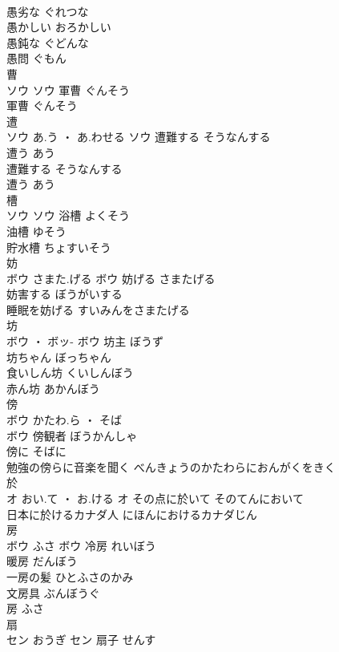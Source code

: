 \documentclass[8pt]{extreport}
\begin{document}
\begin{CJK}{UTF8}{min}
\\	愚劣な	ぐれつな	
\\	愚かしい	おろかしい	
\\	愚鈍な	ぐどんな	
\\	愚問	ぐもん	
\\	曹	
\\	ソウ		ソウ	軍曹	ぐんそう	
\\	軍曹	ぐんそう	
\\	遭	
\\	ソウ	あ.う ・ あ.わせる	ソウ	遭難する	そうなんする	
\\	遭う	あう	
\\	遭難する	そうなんする	
\\	遭う	あう	
\\	槽	
\\	ソウ		ソウ	浴槽	よくそう	
\\	油槽	ゆそう	
\\	貯水槽	ちょすいそう	
\\	妨	
\\	ボウ	さまた.げる	ボウ	妨げる	さまたげる	
\\	妨害する	ぼうがいする	
\\	睡眠を妨げる	すいみんをさまたげる	
\\	坊	
\\	ボウ ・ ボッ-		ボウ													坊主	ぼうず	
\\	坊ちゃん	ぼっちゃん	
\\	食いしん坊	くいしんぼう	
\\	赤ん坊	あかんぼう	
\\	傍	
\\	ボウ	かたわ.ら ・ そば
\\	ボウ	傍観者	ぼうかんしゃ	
\\	傍に	そばに	
\\	勉強の傍らに音楽を聞く	べんきょうのかたわらにおんがくをきく	
\\	於	
\\	オ	おい.て ・ お.ける	オ	その点に於いて	そのてんにおいて	
\\	日本に於けるカナダ人	にほんにおけるカナダじん	
\\	房	
\\	ボウ	ふさ	ボウ	冷房	れいぼう	
\\	暖房	だんぼう	
\\	一房の髪	ひとふさのかみ	
\\	文房具	ぶんぼうぐ	
\\	房	ふさ	
\\	扇	
\\	セン	おうぎ	セン	扇子	せんす	

\end{CJK}
\end{document}
